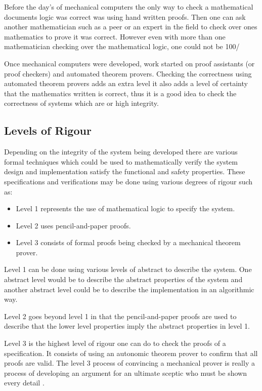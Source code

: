 Before the day's of mechanical computers the only way to check a mathematical documents logic was correct was using hand written proofs. Then one can ask another mathematician such as a peer or an expert in the field to check over ones mathematics to prove it was correct. However even with more than one mathematician checking over the mathematical logic, one could not be 100/%

Once mechanical computers were developed, work started on proof assistants (or proof checkers) and automated theorem provers. Checking the correctness using automated theorem provers adds an extra level it also adds a level of certainty that the mathematics written is correct, thus it is a good idea to check the correctness of systems which are or high integrity.

\subsection{Levels of Rigour}

Depending on the integrity of the system being developed there are various formal techniques which could be used to mathematically verify the system design and implementation satisfy the functional and safety properties. These specifications and verifications may be done using various degrees of rigour such as:

\begin{itemize}
\item Level 1 represents the use of mathematical logic to specify the system.
\item Level 2 uses pencil-and-paper proofs.
\item Level 3 consists of formal proofs being checked by a mechanical theorem prover.
\end{itemize}

Level 1 can be done using various levels of abstract to describe the system. One abstract level would be to describe the abstract properties of the system and another abstract level could be to describe the implementation in an algorithmic way.

Level 2 goes beyond level 1 in that the pencil-and-paper proofs are used to describe that the lower level properties imply the abstract properties in level 1.

Level 3 is the highest level of rigour one can do to check the proofs of a specification. It consists of using an autonomic theorem prover to confirm that all proofs are valid. The level 3 process of convincing a mechanical prover is really a process of developing an argument for an ultimate sceptic who must be shown every detail \cite{encyclopedia}.


